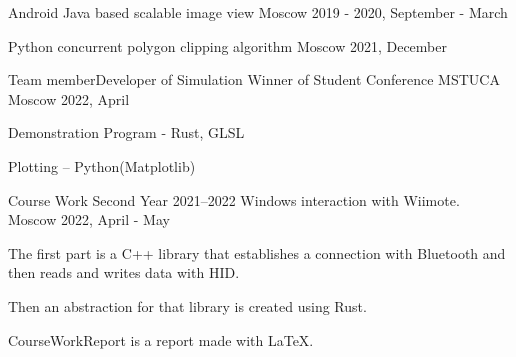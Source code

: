 

\vspace{0cm}\begin{cventries}





	\cventry
	{} %
	{Android Java based scalable image view} %
	{Moscow} %
	{2019 - 2020, September - March} %
	{}

	\cventry
	{} %
	{Python concurrent polygon clipping algorithm} %
	{Moscow} %
	{2021, December} %
	{}


	\cventry
	{Team member{\enskip\cdotp\enskip}Developer of Simulation}
	{Winner of Student Conference MSTUCA}  %
	{Moscow} %
	{2022, April} %
	{
		\begin{cvitems}
			\item {Demonstration Program - Rust, GLSL}
			\item {Plotting – Python(Matplotlib)}
		\end{cvitems}
	}

	\cventry
	{}
	{Course Work Second Year 2021--2022 Windows interaction with Wiimote.}  %
	{Moscow} %
	{2022, April - May} %
	{
		\begin{cvitems}
			\item {The first part is a C++ library that establishes a connection with Bluetooth and then reads and writes data with HID.}
			\item {Then an abstraction for that library is created using Rust.}
			\item {CourseWorkReport is a report made with LaTeX.}
		\end{cvitems}
	}


\end{cventries}
